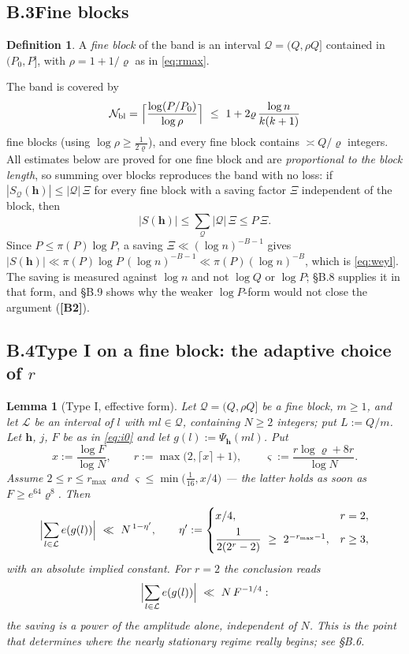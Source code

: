 \documentclass[11pt]{article}
\newtheorem{lemma}[theorem]{Lemma}
\theoremstyle{definition}
\newtheorem{definition}[theorem]{Definition}
\theoremstyle{plain}
\begin{document}
\subsection*{B.3\quad Fine blocks}

\begin{definition}
A \emph{fine block} of the band is an interval $\mathcal Q=(Q,\rho Q]$
contained in $(P_{0},P]$, with $\rho=1+1/\varrho$ as in \eqref{eq:rmax}.
\end{definition}

The band is covered by
\[
\mathcal N_{\mathrm{bl}}
=\Bigl\lceil\frac{\log(P/P_{0})}{\log\rho}\Bigr\rceil
\ \le\ 1+2\varrho\,\frac{\log n}{k(k+1)}
\]
fine blocks (using $\log\rho\ge\frac{1}{2\varrho}$), and every fine block
contains $\asymp Q/\varrho$ integers.  All estimates below are proved for
one fine block and are \emph{proportional to the block length}, so
summing over blocks reproduces the band with no loss:
if $|S_{\mathcal Q}(\mathbf h)|\le|\mathcal Q|\,\Xi$ for every fine block
with a saving factor $\Xi$ independent of the block, then
\begin{equation}\label{eq:blocksum}
|S(\mathbf h)|\le\sum_{\mathcal Q}|\mathcal Q|\,\Xi\le P\,\Xi .
\end{equation}
Since $P\le\pi(P)\log P$, a saving
$\Xi\ll(\log n)^{-B-1}$ gives
$|S(\mathbf h)|\ll\pi(P)\log P\,(\log n)^{-B-1}\ll\pi(P)(\log n)^{-B}$,
which is \eqref{eq:weyl}.  The saving is measured against $\log n$ and
not $\log Q$ or $\log P$; \S B.8 supplies it in that form, and \S B.9
shows why the weaker $\log P$-form would not close the argument
(\textbf{[B2]}).

\subsection*{B.4\quad Type I on a fine block: the adaptive choice of $r$}

\begin{lemma}[Type I, effective form]\label{lem:typeIB}
Let $\mathcal Q=(Q,\rho Q]$ be a fine block, $m\ge1$, and let
$\mathcal L$ be an interval of $l$ with $ml\in\mathcal Q$, containing
$N\ge2$ integers; put $L:=Q/m$.  Let $\mathbf h$, $j$, $F$ be as in
\eqref{eq:i0} and let $g(l):=\Psi_{\mathbf h}(ml)$.  Put
\[
x:=\frac{\log F}{\log N},\qquad
r:=\max\bigl(2,\lceil x\rceil+1\bigr),\qquad
\varsigma:=\frac{r\log\varrho+8r}{\log N}.
\]
Assume $2\le r\le r_{\max}$ and $\varsigma\le\min\bigl(\tfrac1{16},x/4\bigr)$
--- the latter holds as soon as $F\ge e^{64}\varrho^{8}$.  Then
\[
\Bigl|\sum_{l\in\mathcal L}e(g(l))\Bigr|\ \ll\ N^{\,1-\eta'},
\qquad
\eta':=
\begin{cases}
x/4, & r=2,\\[4pt]
\dfrac{1}{2(2^{r}-2)}\ \ge\ 2^{-r_{\max}-1}, & r\ge3,
\end{cases}
\]
with an absolute implied constant.  For $r=2$ the conclusion reads
\[
\Bigl|\sum_{l\in\mathcal L}e(g(l))\Bigr|\ \ll\ N\,F^{-1/4}:
\]
the saving is a power of the amplitude alone, independent of $N$.  This
is the point that determines where the nearly stationary regime really
begins; see \S B.6.
\end{lemma}
\end{document}
